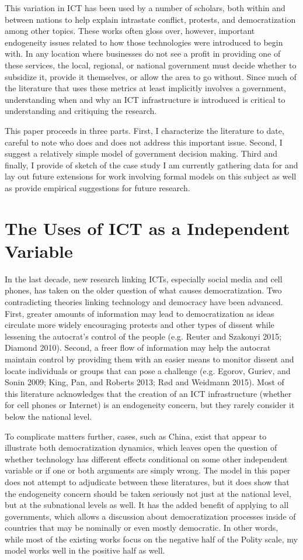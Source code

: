 \documentclass[12pt]{article}
\begin{document}
	This variation in ICT has been used by a number of scholars, both within and between nations to help explain intrastate conflict, protests, and democratization among other topics. These works often gloss over, however, important endogeneity issues related to how those technologies were introduced to begin with. In any location where businesses do not see a profit in providing one of these services, the local, regional, or national government must decide whether to subsidize it, provide it themselves, or allow the area to go without. Since much of the literature that uses these metrics at least implicitly involves a government, understanding when and why an ICT infrastructure is introduced is critical to understanding and critiquing the research.
	
	This paper proceeds in three parts. First, I characterize the literature to date, careful to note who does and does not address this important issue. Second, I suggest a relatively simple model of government decision making. Third and finally, I provide of sketch of the case study I am currently gathering data for and lay out future extensions for work involving formal models on this subject as well as provide empirical suggestions for future research.
	
	\section{The Uses of ICT as a Independent Variable}
	In the last decade, new research linking ICTs, especially social media and cell phones, has taken on the older question of what causes democratization. Two contradicting theories linking technology and democracy have been advanced. First, greater amounts of information may lead to democratization as ideas circulate more widely encouraging protests and other types of dissent while lessening the autocrat’s control of the people (e.g. Reuter and Szakonyi 2015; Diamond 2010). Second, a freer flow of information may help the autocrat maintain control by providing them with an easier means to monitor dissent and locate individuals or groups that can pose a challenge (e.g. Egorov, Guriev, and Sonin 2009; King, Pan, and Roberts 2013; Rød and Weidmann 2015). Most of this literature acknowledges that the creation of an ICT infrastructure (whether for cell phones or Internet) is an endogeneity concern, but they rarely consider it below the national level. 
	
	To complicate matters further, cases, such as China, exist that appear to illustrate both democratization dynamics, which leaves open the question of whether technology has different effects conditional on some other independent variable or if one or both arguments are simply wrong. The model in this paper does not attempt to adjudicate between these literatures, but it does show that the endogeneity concern should be taken seriously not just at the national level, but at the subnational levels as well. It has the added benefit of applying to all governments, which allows a discussion about democratization processes inside of countries that may be nominally or even mostly democratic. In other words, while most of the existing works focus on the negative half of the Polity scale, my model works well in the positive half as well.
	
\end{document}

